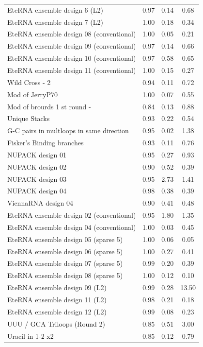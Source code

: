 \documentclass[letter]{bioinfo}
\begin{document}
\begin{center}
\begin{longtable}{l ccc}
EteRNA ensemble design 6 (L2)		&0.97 	&0.14 	&0.68 \\
EteRNA ensemble design 7 (L2)		&1.00 	&0.18 	&0.34 \\
EteRNA ensemble design 08 (conventional)		&1.00 	&0.05 	&0.21 \\
EteRNA ensemble design 09 (conventional)		&0.97 	&0.14 	&0.66 \\
EteRNA ensemble design 10 (conventional)		&0.97 	&0.58 	&0.65 \\
EteRNA ensemble design 11 (conventional)		&1.00 	&0.15 	&0.27 \\
Wild Cross - 	2				&0.94 	&0.11 	&0.72 \\
Mod of JerryP70				&1.00 	&0.07 	&0.55 \\
Mod of brourds 1 st round -		&0.84 	&0.13 	&0.88 \\
Unique Stacks					&0.93 	&0.22 	&0.54 \\
G-C pairs in multloops in same direction		&0.95 	&0.02 	&1.38 \\
Fisker's Binding branches		&0.93 	&0.11 	&0.76 \\
NUPACK design 01				&0.95 	&0.27 	&0.93 \\
NUPACK design 02				&0.90 	&0.52 	&0.39 \\
NUPACK design 03				&0.95 	&2.73 	&1.41 \\
NUPACK design 04				&0.98 	&0.38 	&0.39 \\
ViennaRNA design 04			&0.90 	&0.41 	&0.48 \\
EteRNA ensemble design 02 (conventional)		&0.95 	&1.80 	&1.35 \\
EteRNA ensemble design 04 (conventional)		&1.00 	&0.03 	&0.45 \\
EteRNA ensemble design 05 (sparse 5)		&1.00 	&0.06 	&0.05 \\
EteRNA ensemble design 06 (sparse 5)		&1.00 	&0.27 	&0.41 \\
EteRNA ensemble design 07 (sparse 5)		&0.99 	&0.20 	&0.39 \\
EteRNA ensemble design 08 (sparse 5)		&1.00 	&0.12 	&0.10 \\
EteRNA ensemble design 09 (L2)		&0.99 	&0.28 	&13.50 \\
EteRNA ensemble design 11 (L2)		&0.98 	&0.21 	&0.18 \\
EteRNA ensemble design 12 (L2)		&0.99 	&0.08 	&0.23 \\
UUU / GCA Triloops (Round 2)	&0.85 	&0.51 	&3.00 \\
Uracil in 1-2 x2				&0.85 	&0.12 	&0.79 \\

\end{longtable}
\end{center}
\end{document}
